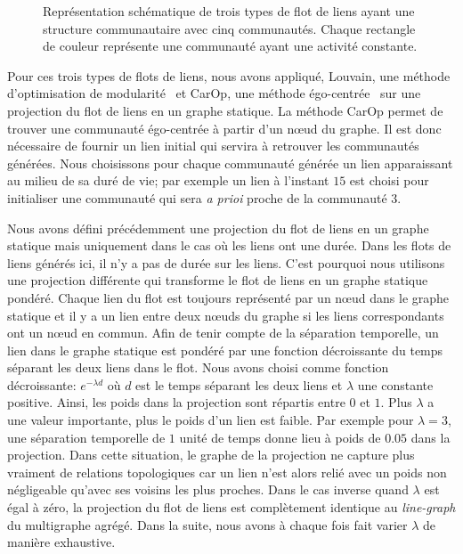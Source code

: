 \begin{figure}
\begin{subfigure}{0.3\textwidth}
		\caption{}
		\label{fig:versqualite_gen_test3}
	\end{subfigure}
	\caption{Représentation schématique de trois types de flot de liens ayant une structure communautaire avec cinq communautés.
	Chaque rectangle de couleur représente une communauté ayant une activité constante.}
	\label{fig:versqualite_gen_test}
\end{figure}

\bigskip
Pour ces trois types de flots de liens, nous avons appliqué, Louvain, une méthode d'optimisation de modularité~\cite{Blondel2008a} et CarOp, une méthode égo-centrée~\cite{Danisch2012} sur une projection du flot de liens en un graphe statique.
La méthode CarOp permet de trouver une communauté égo-centrée à partir d'un n\oe ud du graphe.
Il est donc nécessaire de fournir un lien initial qui servira à retrouver les communautés générées.
Nous choisissons pour chaque communauté générée un lien apparaissant au milieu de sa duré de vie; par exemple un lien à l'instant $15$ est choisi pour initialiser une communauté qui sera \emph{a prioi} proche de la communauté $3$.


Nous avons défini précédemment une projection du flot de liens en un graphe statique mais uniquement dans le cas où les liens ont une durée.
Dans les flots de liens générés ici, il n'y a pas de durée sur les liens.
C'est pourquoi nous utilisons une projection différente qui transforme le flot de liens en un graphe statique pondéré.
Chaque lien du flot est toujours représenté par un n\oe ud dans le graphe statique et il y a un lien entre deux n\oe uds du graphe si les liens correspondants ont un n\oe ud en commun.
Afin de tenir compte de la séparation temporelle, un lien dans le graphe statique est pondéré par une fonction décroissante du temps séparant les deux liens dans le flot.
Nous avons choisi comme fonction décroissante: $e^{-\lambda d}$ où $d$ est le temps séparant les deux liens et $\lambda$ une constante positive.
Ainsi, les poids dans la projection sont répartis entre $0$ et $1$.
Plus $\lambda$ a une valeur importante, plus le poids d'un lien est faible.
Par exemple pour $\lambda=3$, une séparation temporelle de $1$ unité de temps donne lieu à poids de $0.05$ dans la projection.
Dans cette situation, le graphe de la projection ne capture plus vraiment de relations topologiques car un lien n'est alors relié avec un poids non négligeable qu'avec ses voisins les plus proches.
Dans le cas inverse quand $\lambda$ est égal à zéro, la projection du flot de liens est complètement identique au \emph{line-graph} du multigraphe agrégé.
Dans la suite, nous avons à chaque fois fait varier $\lambda$ de manière exhaustive.

